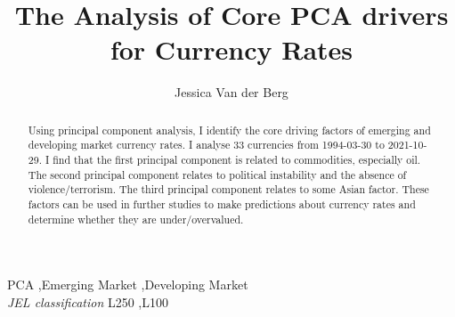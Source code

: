 \documentclass[11pt,preprint, authoryear]{elsarticle}
\numberwithin{equation}{section}
\numberwithin{figure}{section}
\numberwithin{table}{section}
\begin{document}
\begin{frontmatter}  %

\title{The Analysis of Core PCA drivers for Currency Rates}





\author[Add1]{Jessica Van der Berg}





\address[Add1]{Stellenbosch Univeristy, South Africa}


\begin{abstract}
\small{
Using principal component analysis, I identify the core driving factors
of emerging and developing market currency rates. I analyse 33
currencies from 1994-03-30 to 2021-10-29. I find that the first
principal component is related to commodities, especially oil. The
second principal component relates to political instability and the
absence of violence/terrorism. The third principal component relates to
some Asian factor. These factors can be used in further studies to make
predictions about currency rates and determine whether they are
under/overvalued.
}
\end{abstract}

\vspace{1cm}


\begin{keyword}
\footnotesize{
PCA \sep Emerging Market \sep Developing Market \\
\vspace{0.3cm}
}
\footnotesize{
\textit{JEL classification} L250 \sep L100
}
\end{keyword}



\vspace{0.5cm}

\end{frontmatter}



\pagestyle{fancy}
\chead{}
\lfoot{}
\lhead{}
\cfoot{}

\end{document}
